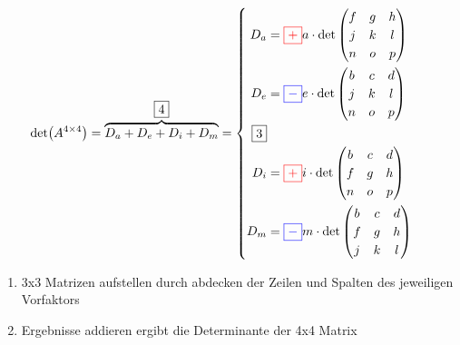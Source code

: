 \begin{equation}
    \det(A^{4\times4}) = \overbrace{D_a + D_e + D_i + D_m}^{\boxed{4}} =
        \begin{cases}
            \begin{aligned}
            D_a &= {\color{red}\boxed{+}} a \cdot \det\begin{pmatrix}
                        f & g & h\\ 
                        j & k & l\\
                        n & o & p
                    \end{pmatrix} \\ 
            D_e &= {\color{blue}\boxed{-}} e \cdot \det\begin{pmatrix}
                        b & c & d\\
                        j & k & l\\
                        n & o & p
                    \end{pmatrix} \\
            \boxed{3}\\
            D_i &= {\color{red}\boxed{+}} i \cdot \det\begin{pmatrix}
                        b & c & d\\
                        f & g & h\\ 
                        n & o & p
                    \end{pmatrix} \\
            D_m &= {\color{blue}\boxed{-}} m \cdot \det\begin{pmatrix}
                        b & c & d\\
                        f & g & h\\
                        j & k & l
                    \end{pmatrix}
            \end{aligned}
        \end{cases}
    \label{eq:nxn_Determinante}
\end{equation}
\begin{enumerate}[start=3]
    \item 3x3 Matrizen aufstellen durch abdecken der Zeilen und Spalten des jeweiligen Vorfaktors
    \item Ergebnisse addieren ergibt die Determinante der 4x4 Matrix
\end{enumerate}